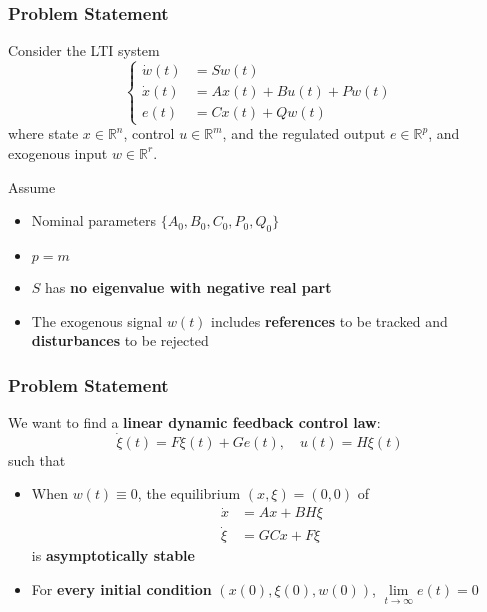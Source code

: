 \documentclass{beamer}
\begin{document}
\begin{frame}[fragile]
	\frametitle{{\color{red}Problem Statement}}
Consider the LTI system
\begin{equation}\label{lti}
    \left\{\begin{aligned}
    \dot{w}(t) &=Sw(t) \\
    \dot{x}(t) &= Ax(t)+Bu(t)+Pw(t) \\
    e(t) &= Cx(t)+Qw(t)
    \end{aligned}
    \right.
\end{equation}
where state $x \in \mathbb{R}^{n}$, control $u \in \mathbb{R}^{m}$, and the regulated output $e \in \mathbb{R}^{p}$, and exogenous input $w \in \mathbb{R}^{r}$.

Assume
\begin{itemize}
  \item Nominal parameters $\{ A_{0},B_{0}, C_{0}, P_{0}, Q_{0} \}$
  \item $p=m$
  \item $S$ has \textbf{no eigenvalue with negative real part}
  \item The exogenous signal $w(t)$ includes \textbf{references} to be tracked and \textbf{disturbances} to be rejected
\end{itemize}
\end{frame}


\begin{frame}[fragile]
	\frametitle{{\color{red}Problem Statement}}
We want to find a \textbf{linear dynamic feedback control law}:
$$
\dot{\xi}(t) = F\xi(t)+Ge(t),\quad u(t) = H\xi(t)
$$
such that
\begin{itemize}
  \item When $w(t)\equiv 0$, the equilibrium $(x,\xi)=(0,0)$ of
  \begin{equation}\label{augnment}
    \begin{aligned}
      \dot{x} &= Ax+BH\xi \\
      \dot{\xi} &= GCx+F\xi
    \end{aligned}
  \end{equation}
  is \textbf{asymptotically stable}
  \item For \textbf{every initial condition} $(x(0),\xi(0),w(0))$, $\lim\limits_{t\rightarrow \infty} e(t) = 0$
\end{itemize}
\end{frame}
\end{document}
